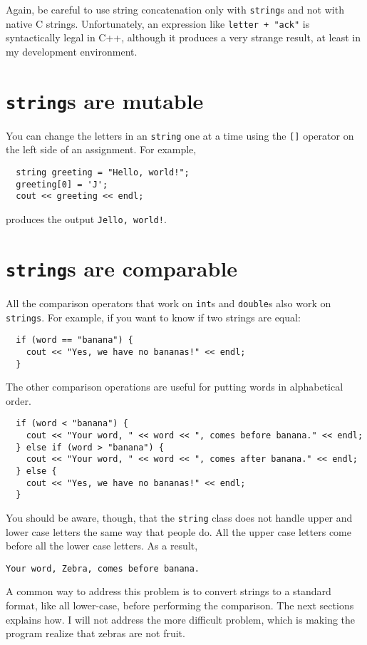 Again, be careful to use string concatenation only with {\tt string}s
and not with native C strings.  Unfortunately, an expression like
{\tt letter + "ack"} is syntactically legal in C++, although it
produces a very strange result, at least in my development environment.

\section{{\tt string}s are mutable}

You can change the letters in an {\tt string} one at a time
using the {\tt []} operator on the left side of an assignment.
For example,

\begin{lstlisting}
  string greeting = "Hello, world!";
  greeting[0] = 'J';
  cout << greeting << endl;
\end{lstlisting}
%
produces the output {\tt Jello, world!}.


\section{{\tt string}s are comparable}
\label{incomparable}

All the comparison operators that work on {\tt int}s and
{\tt double}s also work on {\tt strings}.  For example,
if you want to know if two strings are equal:

\begin{lstlisting}
  if (word == "banana") {
    cout << "Yes, we have no bananas!" << endl;
  }
\end{lstlisting}
%
The other comparison operations are useful for putting words
in alphabetical order.

\begin{lstlisting}
  if (word < "banana") {
    cout << "Your word, " << word << ", comes before banana." << endl;
  } else if (word > "banana") {
    cout << "Your word, " << word << ", comes after banana." << endl;
  } else {
    cout << "Yes, we have no bananas!" << endl;
  }
\end{lstlisting}
%
You should be aware, though, that the {\tt string} class does
not handle upper and lower case letters the same way that people
do.  All the upper case letters come before all the lower case
letters.  As a result,

\begin{lstlisting}
Your word, Zebra, comes before banana.
\end{lstlisting}
%
A common way to address this problem is to convert strings to a
standard format, like all lower-case, before performing the
comparison.  The next sections explains how.  I will not address the
more difficult problem, which is making the program realize that
zebras are not fruit.

